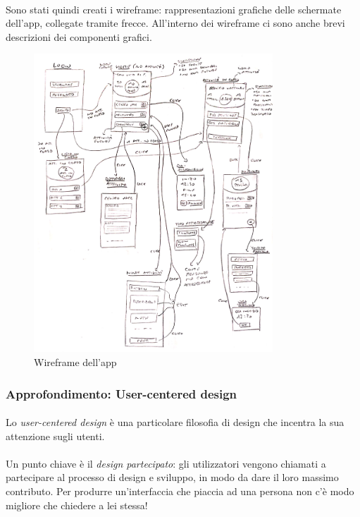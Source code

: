 \documentclass[11pt,a4paper,english]{article}
\begin{document}
\paragraph{} Sono stati quindi creati i wireframe: rappresentazioni grafiche delle schermate dell'app, collegate tramite frecce. All'interno dei wireframe ci sono anche brevi descrizioni dei componenti grafici.

\begin{figure}[H]
    \centering
    \includegraphics[width=0.8\textwidth]{img/wireframe app.pdf}
    \caption{Wireframe dell'app}
\end{figure}



\subsubsection{Approfondimento: User-centered design}

\paragraph{} Lo \emph{user-centered design} \cite{ucd} è una particolare filosofia di design che incentra la sua attenzione sugli utenti.

\paragraph{} Un punto chiave è il \emph{design partecipato}: gli utilizzatori vengono chiamati a partecipare al processo di design e sviluppo, in modo da dare il loro massimo contributo. Per produrre un'interfaccia che piaccia ad una persona non c'è modo migliore che chiedere a lei stessa!
\end{document}
